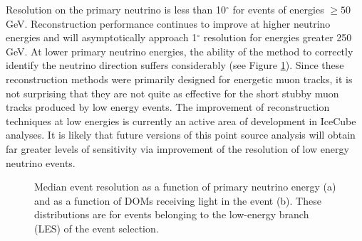 \documentclass{gatech-thesis}
\begin{document}
Resolution on the primary neutrino is less than 10$^{\circ}$ for events of energies $\geq 50$GeV. Reconstruction performance continues to improve at higher neutrino energies and will asymptotically approach 1$^{\circ}$ resolution for energies greater 250 GeV. At lower primary neutrino energies, the ability of the method to correctly identify the neutrino direction suffers considerably (see Figure \ref{fig:EventRes}). Since these reconstruction methods were primarily designed for energetic muon tracks, it is not surprising that they are not quite as effective for the short stubby muon tracks produced by low energy events. The improvement of reconstruction techniques at low energies is currently an active area of development in IceCube analyses. It is likely that future versions of this point source analysis will obtain far greater levels of sensitivity via improvement of the resolution of low energy neutrino events.
\begin{figure}
\centering
{}
\caption[Final Level Event Resolution]{Median event resolution as a function of primary neutrino energy (a) and as a function of DOMs receiving light in the event (b). These distributions are for events belonging to the low-energy branch (LES) of the event selection.}
\label{fig:EventRes}
\end{figure}
\end{document}
